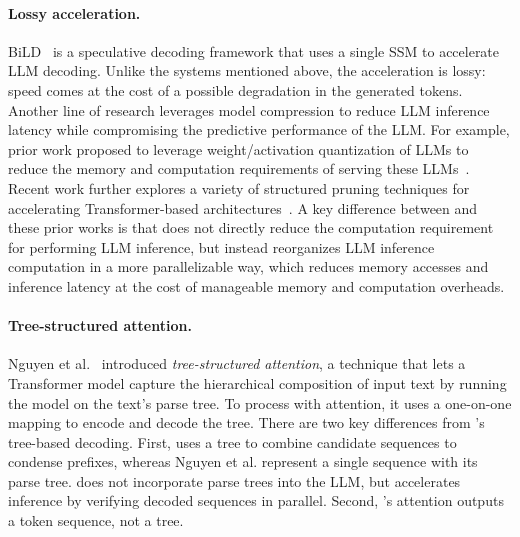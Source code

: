 \paragraph{Lossy acceleration.}
BiLD~\cite{biglittletransformer} is a speculative decoding framework that uses a single SSM to accelerate LLM decoding. Unlike the systems mentioned above, the acceleration is lossy: speed comes at the cost of a possible degradation in the generated tokens.
Another line of research leverages model compression to reduce LLM inference latency while compromising the predictive performance of the LLM.
For example, prior work proposed to leverage weight/activation quantization of LLMs to reduce the memory and computation requirements of serving these LLMs~\cite{xiao2022smoothquant,frantar2023gptq,park2022nuqmm,yao2022zeroquant,dettmers2022gpt3}.
Recent work further explores a variety of structured pruning techniques for accelerating Transformer-based architectures~\cite{frantar2023sparsegpt,wang2021spatten,hubara2021accelerated}.
A key difference between \SpecInfer and these prior works is that \SpecInfer does not directly reduce the computation requirement for performing LLM inference, but instead reorganizes LLM inference computation in a more parallelizable way, which reduces memory accesses and inference latency at the cost of manageable memory and computation overheads.

\paragraph{Tree-structured attention.}
Nguyen et al.~\cite{Nguyen2020} introduced {\em tree-structured attention}, a technique that lets a Transformer model capture the hierarchical composition of input text by running the model on the text's parse tree. To process with attention, it uses a one-on-one mapping to encode and decode the tree.
There are two key differences from \SpecInfer's tree-based decoding. First, \SpecInfer uses a tree to combine candidate sequences to condense prefixes, whereas Nguyen et al. represent a single sequence with its parse tree. \SpecInfer does not incorporate parse trees into the LLM, but accelerates inference by verifying decoded sequences in parallel. Second, \SpecInfer's attention outputs a token sequence, not a tree.

